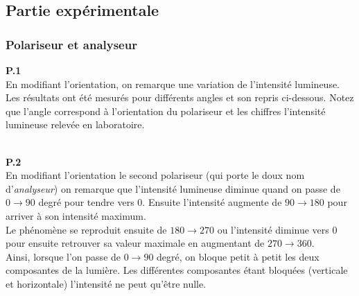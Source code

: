 \documentclass[british,french,11pt, a4paper, openany]{book}
\begin{document}
		\subsection{Partie expérimentale}
		\subsubsection*{Polariseur et analyseur}
		\textbf{P.1}\\
		En modifiant l'orientation, on remarque une variation de l'intensité lumineuse. Les résultats ont été mesurés pour différents angles et son repris ci-dessous. Notez que l'angle correspond à l'orientation du polariseur et les chiffres l'intensité lumineuse relevée en laboratoire.
		\begin{center}
		\end{center}
		\ \\
		\textbf{P.2}\\
		En modifiant l'orientation le second polariseur (qui porte le doux nom d'\textit{analyseur}) on remarque que l'intensité lumineuse diminue quand on passe de $0 \rightarrow 90$ degré pour tendre vers 0. Ensuite l'intensité augmente de $90 \rightarrow 180$ pour arriver à son intensité maximum.\\
		Le phénomène se reproduit ensuite de $180 \rightarrow 270$ ou l'intensité diminue vers 0 pour ensuite retrouver sa valeur maximale en augmentant de $270 \rightarrow 360$.\\
		
		Ainsi, lorsque l'on passe de $0 \rightarrow 90$ degré, on bloque petit à petit les deux composantes de la lumière. Les différentes composantes étant bloquées (verticale et horizontale) l'intensité ne peut qu'être nulle.\\
		
\end{document}
